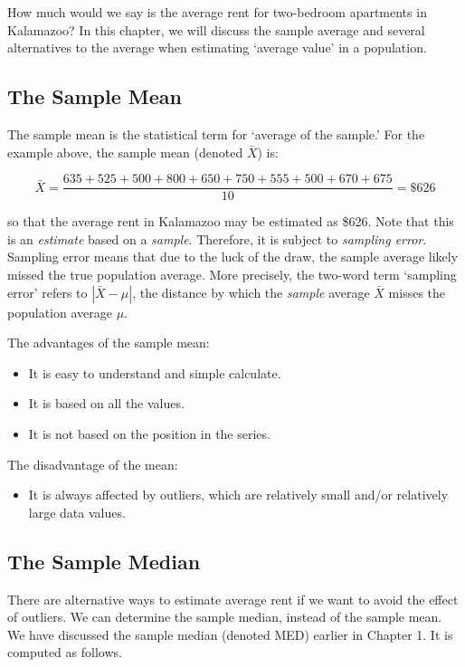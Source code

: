 \documentclass[11pt]{book}\usepackage[]{graphicx}\usepackage[]{color}
\begin{document}
How much would we say is the average rent for two-bedroom apartments in Kalamazoo?  In this chapter, we will discuss the sample average and several alternatives to the average when estimating `average value' in a population.

\subsection{The Sample Mean}

The sample mean is the statistical term for `average of the sample.'  For the example above, the sample mean (denoted $\bar{X}$) is:

$$ \bar{X} = \frac{635+525+500+800+650+750+555+500+670+675}{10} = \$626 $$

so that the average rent in Kalamazoo may be estimated as \$626.  Note that this is an \textit{estimate} based on a \textit{sample}.  Therefore, it is subject to \textit{sampling error}.   Sampling error means that due to the luck of the draw, the sample average likely missed the true population average.  More precisely, the two-word term `sampling error' refers to $| \bar{X} - \mu |$,  the distance by which the \textit{sample} average $\bar{X}$  misses the population average  $\mu$.

The advantages of the sample mean:

\begin{itemize}
\item It is easy to understand and simple calculate.
\item It is based on all the values.
\item It is not based on the position in the series.
\end{itemize}

The disadvantage of the mean:

\begin{itemize}
\item It is always affected by outliers, which are relatively small and/or relatively large data values.
\end{itemize}

\subsection{The Sample Median}

There are alternative ways to estimate average rent if we want to avoid the effect of outliers.  We can determine the sample median, instead of the sample mean.  We have discussed the sample median (denoted MED) earlier in Chapter 1.  It is computed as follows.
\end{document}
